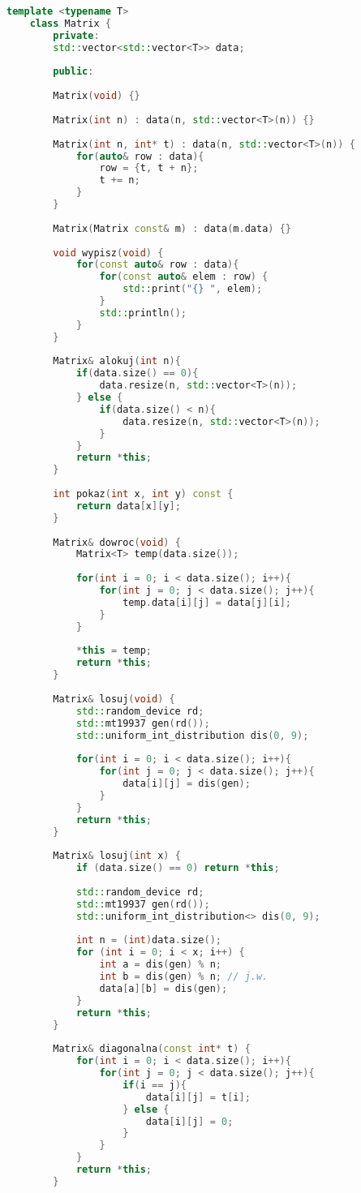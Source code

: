 \begin{lstlisting}[caption=Klasa \texttt{Matrix}, label={lst:matrixclass}, language=C++]
	template <typename T>
	class Matrix {
		private:
		std::vector<std::vector<T>> data;
		
		public:
		
		Matrix(void) {}
		
		Matrix(int n) : data(n, std::vector<T>(n)) {}
		
		Matrix(int n, int* t) : data(n, std::vector<T>(n)) {
			for(auto& row : data){
				row = {t, t + n};
				t += n;
			}
		}
		
		Matrix(Matrix const& m) : data(m.data) {}
		
		void wypisz(void) {
			for(const auto& row : data){
				for(const auto& elem : row) {
					std::print("{} ", elem);
				}
				std::println();
			}
		}
		
		Matrix& alokuj(int n){
			if(data.size() == 0){
				data.resize(n, std::vector<T>(n));
			} else {
				if(data.size() < n){
					data.resize(n, std::vector<T>(n));
				}
			}
			return *this;
		}
		
		int pokaz(int x, int y) const {
			return data[x][y];
		}
		
		Matrix& dowroc(void) {
			Matrix<T> temp(data.size());
			
			for(int i = 0; i < data.size(); i++){
				for(int j = 0; j < data.size(); j++){
					temp.data[i][j] = data[j][i];
				}
			}
			
			*this = temp;
			return *this;
		}
		
		Matrix& losuj(void) {
			std::random_device rd;
			std::mt19937 gen(rd());
			std::uniform_int_distribution dis(0, 9);
			
			for(int i = 0; i < data.size(); i++){
				for(int j = 0; j < data.size(); j++){
					data[i][j] = dis(gen);
				}
			}
			return *this;
		}
		
		Matrix& losuj(int x) {
			if (data.size() == 0) return *this;
			
			std::random_device rd;
			std::mt19937 gen(rd());
			std::uniform_int_distribution<> dis(0, 9);
			
			int n = (int)data.size();
			for (int i = 0; i < x; i++) {
				int a = dis(gen) % n;
				int b = dis(gen) % n; // j.w.
				data[a][b] = dis(gen);
			}
			return *this;
		}
		
		Matrix& diagonalna(const int* t) {
			for(int i = 0; i < data.size(); i++){
				for(int j = 0; j < data.size(); j++){
					if(i == j){
						data[i][j] = t[i];
					} else {
						data[i][j] = 0;
					}
				}
			}
			return *this;
		}
		

\end{lstlisting}
